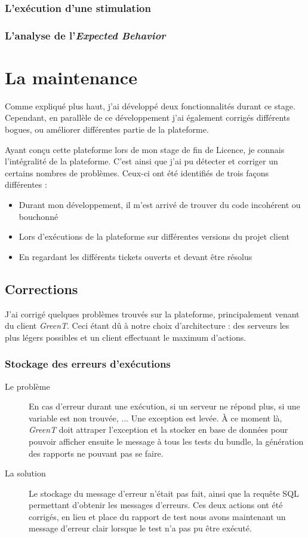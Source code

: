 \subsubsection{L'exécution d'une stimulation}
\subsubsection{L'analyse de l'\textit{Expected Behavior}}
\section{La maintenance}
Comme expliqué plus haut, j'ai développé deux fonctionnalités durant ce stage. Cependant, en parallèle de ce développement j'ai également corrigés différents bogues, ou améliorer différentes partie de la plateforme.

Ayant conçu cette plateforme lors de mon stage de fin de Licence, je connais l'intégralité de la plateforme. C'est ainsi que j'ai pu détecter et corriger un certains nombres de problèmes. Ceux-ci ont été identifiés de trois façons différentes : 
\begin{itemize}
	\item Durant mon développement, il m'est arrivé de trouver du code incohérent ou bouchonné
	\item Lors d'exécutions de la plateforme sur différentes versions du projet client
	\item En regardant les différents tickets ouverts et devant être résolus
\end{itemize}

\subsection{Corrections}
J'ai corrigé quelques problèmes trouvés sur la plateforme, principalement venant du client \textit{GreenT}. Ceci étant dû à notre choix d'architecture : des serveurs les plus légers possibles et un client effectuant le maximum d'actions.
	\subsubsection{Stockage des erreurs d'exécutions}
	\begin{description}
		\item[Le problème] En cas d'erreur durant une exécution, si un serveur ne répond plus, si une variable est non trouvée, ... Une exception est levée. À ce moment là, \textit{GreenT} doit attraper l'exception et la stocker en base de données pour pouvoir afficher ensuite le message à tous les tests du bundle, la génération des rapports ne pouvant pas se faire.
		\item[La solution] Le stockage du message d'erreur n'était pas fait, ainsi que la requête SQL permettant d'obtenir les messages d'erreurs. Ces deux actions ont été corrigés, en lieu et place du rapport de test nous avons maintenant un message d'erreur clair lorsque le test n'a pas pu être exécuté.
		\end{description}
		
